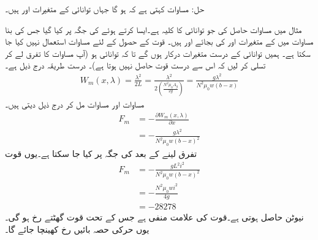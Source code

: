 حل:\quad
مساوات   کہتی ہے کہ  ہو گا جہاں توانائی کے متغیرات   اور  ہیں۔

مثال  میں  مساوات  حاصل کی جو توانائی کا کلیہ ہے۔ایسا کرتے ہوئے    کی  جگہ   پر کیا گیا جس کی بنا مساوات  میں   کے متغیرات  اور  کی بجائے    اور  ہیں۔  قوت کے حصول کے لئے  مساوات  استعمال نہیں کیا جا سکتا ہے۔ ہمیں  توانائی کے درست متغیرات درکار ہوں گے تا کہ توانائی  ہو (آپ مساوات  کا تفرق لے کر تسلی کر لیں کہ اس سے درست قوت حاصل نہیں ہوتا ہے)۔ درست طریقہ درج ذیل ہے۔
\begin{align}\label{مساوات_تبادلہ_درست_متغیرات}
W_m(x,\lambda)=\frac{\lambda^2}{2 L}=\frac{\lambda^2}{2 \left(\frac{N^2 \mu_0 A_g}{2 g} \right)}=\frac{ g \lambda^2}{N^2 \mu_0 w (b-x)}
\end{align}
مساوات  اور مساوات  مل کر درج ذیل دیتی ہیں۔
\begin{align*}
F_m&=-\frac{\partial W_m(x,\lambda)}{\partial x}\\
&=-\frac{g \lambda^2}{N^2 \mu_0 w (b-x)^2}
\end{align*}
تفرق لینے کے بعد  کی جگہ  پر کیا جا سکتا ہے۔یوں قوت
\begin{align*}
F_m&=-\frac{g L^2 i^2}{N^2 \mu_0 w (b-x)^2}\\
&=-\frac{N^2 \mu_0 w i^2}{4 g}\\
&=\num{-28278}
\end{align*}
نیوٹن حاصل ہوتی ہے۔قوت کی علامت منفی ہے جس کے تحت قوت   گھٹتے  رخ ہو گی۔یوں حرکی حصہ بائیں رخ کھینچا جائے گا۔ 

